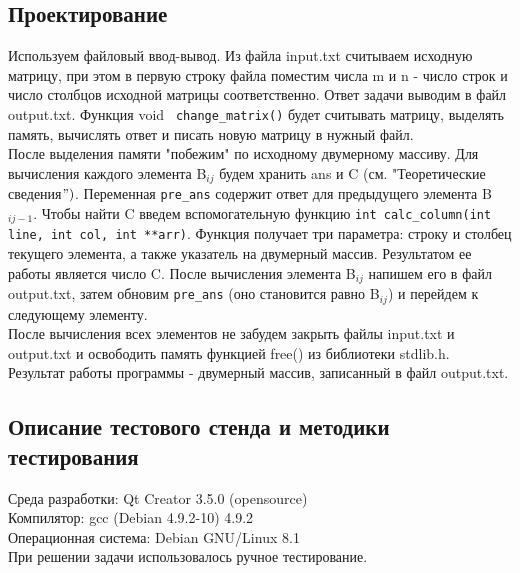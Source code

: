 \documentclass[12pt,a4paper]{report}
\begin{document}
\subsection{Проектирование}
Используем файловый ввод-вывод. Из файла input.txt считываем исходную матрицу, при этом в первую строку файла поместим числа m и n - число строк и число столбцов исходной матрицы соответственно. Ответ задачи выводим в файл output.txt. Функция void \verb+ change_matrix()+ будет считывать матрицу, выделять память, вычислять ответ и писать новую матрицу в нужный файл. \\
После выделения памяти "побежим" по исходному двумерному массиву. Для вычисления каждого элемента B$_{i j}$ будем хранить ans и C (см. "Теоретические сведения$")$. Переменная \verb+pre_ans+ содержит ответ для предыдущего элемента B$_{i j-1}$. Чтобы найти C введем вспомогательную функцию \verb+int calc_column(int line, int col, int **arr)+. Функция получает три параметра: строку и столбец текущего элемента, а также указатель на двумерный массив. Результатом ее работы является число C. После вычисления элемента B$_{i j}$ напишем его в файл output.txt, затем обновим \verb+pre_ans+ (оно становится равно B$_{i j}$) и перейдем к следующему элементу. \\
После вычисления всех элементов не забудем закрыть файлы input.txt и output.txt и освободить память функцией free() из библиотеки stdlib.h. \\
Результат работы программы - двумерный массив, записанный в файл output.txt. 
\subsection{Описание тестового стенда и методики тестирования}
Среда разработки: Qt Creator 3.5.0 (opensource)\\
Компилятор: gcc (Debian 4.9.2-10) 4.9.2 \\
Операционная система: Debian GNU/Linux 8.1 \\
При решении задачи использовалось ручное тестирование. 
\end{document}
